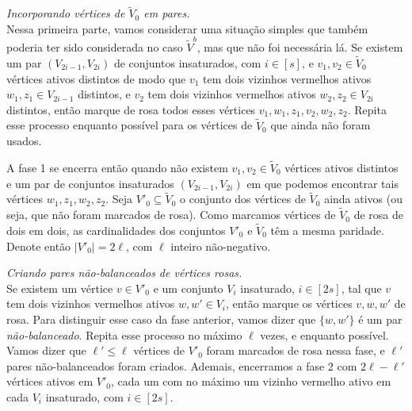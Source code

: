 \begin{fase}
	\emph{Incorporando vértices de $\tilde{V}_0$ em pares.}\\
	Nessa primeira parte, vamos considerar uma situação simples que também poderia ter sido considerada no caso $\tilde{V}^b$, mas que não foi necessária lá. Se existem um par $(V_{2i-1}, V_{2i})$ de conjuntos insaturados, com $i\in[s]$, e $v_1,v_2\in \tilde{V}_0$ vértices ativos distintos de modo que $v_1$ tem dois vizinhos vermelhos ativos $w_1,z_1\in V_{2i-1}$ distintos, e $v_2$ tem dois vizinhos vermelhos ativos $w_2,z_2\in V_{2i}$ distintos, então marque de rosa todos esses vértices $v_1,w_1,z_1,v_2,w_2,z_2$. Repita esse processo enquanto possível para os vértices de $\tilde{V}_0$ que ainda não foram usados.
	
	A fase 1 se encerra então quando não existem $v_1,v_2\in\tilde{V}_0$ vértices ativos distintos e um par de conjuntos insaturados $(V_{2i-1},V_{2i})$ em que podemos encontrar tais vértices $w_1,z_1,w_2,z_2$. Seja $V'_0\subseteq \tilde{V}_0$ o conjunto dos vértices de $\tilde{V}_0$ ainda ativos (ou seja, que não foram marcados de rosa). Como marcamos vértices de $\tilde{V}_0$ de rosa de dois em dois, as cardinalidades dos conjuntos $V'_0$ e $\tilde{V}_0$ têm a mesma paridade. Denote então $|V'_0| = 2\ell$, com $\ell$ inteiro não-negativo.
\end{fase}

\begin{fase}
	\emph{Criando pares não-balanceados de vértices rosas.}\\
	Se existem um vértice $v\in V'_0$ e um conjunto $V_i$ insaturado, $i\in[2s]$, tal que $v$ tem dois vizinhos vermelhos ativos $w,w'\in V_i$, então marque os vértices $v,w,w'$ de rosa. Para distinguir esse caso da fase anterior, vamos dizer que $\{w,w'\}$ é um par \emph{não-balanceado}.
	Repita esse processo no máximo $\ell$ vezes, e enquanto possível. Vamos dizer que $\ell'\leq\ell$ vértices de $V'_0$ foram marcados de rosa nessa fase, e $\ell'$ pares não-balanceados foram criados. Ademais, encerramos a fase 2 com $2\ell - \ell'$ vértices ativos em $V'_0$, cada um com no máximo um vizinho vermelho ativo em cada $V_i$ insaturado, com $i\in[2s]$.
\end{fase}

